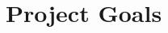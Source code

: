 \documentclass[10pt,tgadventor, onlymath]{beamer}
\begin{document}
%


\section{Project Goals}
\end{document}
